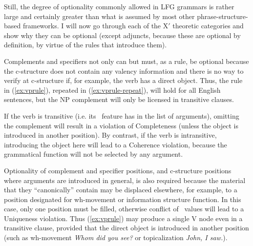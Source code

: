 \documentclass[output=paper,hidelinks]{langscibook}
\begin{document}
 Still, the degree of optionality commonly allowed in LFG grammars is rather large and certainly greater than what is assumed by most other phrase-structure-based frameworks. I will now go through each of the X$'$ theoretic categories and show why they can be optional (except adjuncts, because these are optional by definition, by virtue of the rules that introduce them).
 
  Complements and specifiers not only can but must, as a rule, be optional because the c-structure does not contain any valency information and there is no way to verify at c-structure if, for example, the verb has a direct object. Thus, the rule in (\ref{ex:vprule}), repeated in (\ref{ex:vprule-repeat}),  will hold for all English sentences, but the NP complement will only be licensed in transitive clauses. 

  \ea\label{ex:vprule-repeat}
 \z
 
 If the verb is transitive (i.e. its \PRED\ feature has \OBJ in the list of arguments), omitting the complement will result in a violation of Completeness (unless the object is introduced in another position). By contrast, if the verb is intransitive, introducing the object here will lead to a Coherence violation, because the grammatical function \OBJ will not be selected by any argument.

 Optionality of complement and specifier positions, and c-structure positions where arguments are introduced in general, is also required because the material that they ``canonically'' contain may be displaced elsewhere, for example, to a position designated for wh-movement or information structure function. In this case, only one position must be filled, otherwise conflict of \PRED\ values will lead to a Uniqueness violation. Thus (\ref{ex:vprule}) may produce a single V node even in a transitive clause, provided that the direct object is introduced in another position (such as wh-movement \textit{Whom did you see?} or topicalization \textit{John, I saw.}).
 
\end{document}
